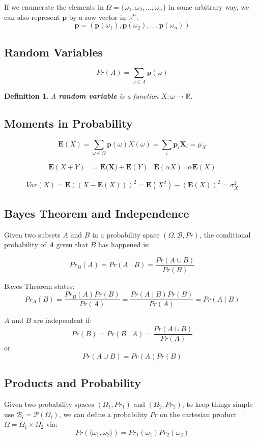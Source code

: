 \documentclass[11pt]{article}
\newtheorem{defn}{Definition}
\begin{document}
If we enumerate the elements in $\Omega = \{\omega_1, \omega_2, \ldots, \omega_n \}$ in some arbitrary way, we can also represent $\textbf{p}$ by a row vector in $\mathbb{R}^n$:
\[
  \textbf{p} = (\textbf{p}(\omega_1), \textbf{p}(\omega_2), \ldots, \textbf{p}(\omega_n))
\]

\subsection{Random Variables} 
\[
  Pr(A) = \sum_{\omega \in A} \textbf{p}(\omega)
\]

\begin{defn}
  A \textbf{random variable} is a function $X : \omega \rightarrow \mathbb{R}$.
\end{defn}

\subsection{Moments in Probability}
\[
  \textbf{E}(X) = \sum_{\omega \in \Omega} \textbf{p}(\omega)X(\omega) = \sum_i \textbf{p}_i \textbf{X}_i = \mu_X
\]

\begin{align*}
  \textbf{E}(X + Y) &= \textbf{E(X)} + \textbf{E}(Y) & \textbf{E}(\alpha X) & \alpha \textbf{E}(X)
\end{align*}

\[
  Var(X) = \textbf{E}((X - \textbf{E}(X)))^2 = \textbf{E}(X^2) - (\textbf{E}(X))^2 = \sigma_X^2
\]

\subsection{Bayes Theorem and Independence}
Given two subsets $A$ and $B$ in a probability space $(\Omega, \mathcal{B}, Pr)$, the conditional probability of $A$ given that $B$ has happened is:

\[
  Pr_B(A) = Pr(A \mid B) = \frac{Pr(A \cup B)}{Pr(B)}
\]

Bayes Theorem states:
\[
  Pr_A(B) = \frac{Pr_B(A)Pr(B)}{Pr(A)} = \frac{Pr(A \mid B)Pr(B)}{Pr(A)} = Pr(A \mid B)
\]

$A$ and $B$ are independent if:
\[
  Pr(B) = Pr(B \mid A) = \frac{Pr(A \cup B)}{Pr(A)}
\]
or  
\[
  Pr(A \cup B) = Pr(A)Pr(B)
\]

\subsection{Products and Probability}
Given two probability spaces $(\Omega_1, Pr_1)$ and $(\Omega_2, Pr_2)$, to keep things simple use $\mathcal{B_i} = \mathcal{P}(\Omega_i)$, we can define a probability $Pr$ on the cartesian product $\Omega = \Omega_1 \times \Omega_2$ via:
\[
  Pr(\langle \omega_1, \omega_2 \rangle) = Pr_1(\omega_1)Pr_2(\omega_2)
\]
\end{document}
